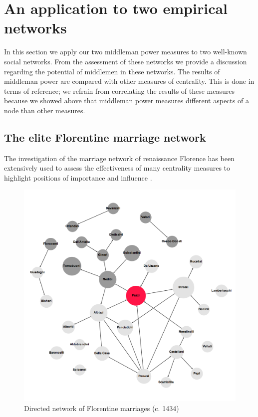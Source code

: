 \documentclass[11pt,fleqn]{article}
\begin{document}
\section{An application to two empirical networks}
\label{sec:empiricalNetwork}

In this section we apply our two middleman power measures to two well-known social networks. From the assessment of these networks we provide a discussion regarding the potential of middlemen in these networks. The results of middleman power are compared with other measures of centrality. This is done in terms of reference; we refrain from correlating the results of these measures because we showed above that middleman power measures different aspects of a node than other measures.

\subsection{The elite Florentine marriage network}

The investigation of the marriage network of renaissance Florence has been extensively used to assess the effectiveness of many centrality measures to highlight positions of importance and influence \citep{Newman2003betweenness}.

\begin{figure}[t]
\centering
\includegraphics[scale=0.37]{Images/Florentine-marr.png}
\caption{Directed network of Florentine marriages (c. 1434)}
\label{Fig:FlorentineFamilies}
\end{figure}
\end{document}
